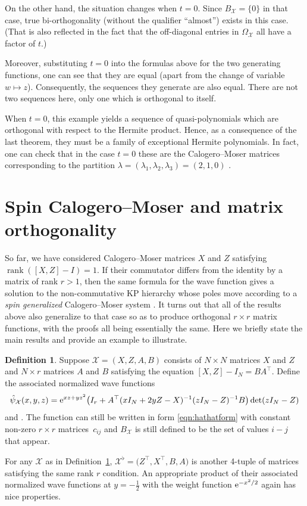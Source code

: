 \documentclass[10pt,a4paper]{amsart}
\numberwithin{equation}{section}
\theoremstyle{definition}
\newtheorem{Definition}[Theorem]{Definition}
\def\X{\mathcal{X}}
\begin{document}
On the other hand, the situation changes when $t=0$. Since
$B_{\X}=\{0\}$ in that case,
 true bi-orthogonality (without the qualifier ``almost'') exists
in this case. (That is also reflected in the fact that the
off-diagonal entries in $\Omega_{\X}$ all have a factor of $t$.)

Moreover, substituting $t=0$ into the formulas above for the two
generating functions, one can see that they are equal
(apart from the change of variable $w\mapsto z$). Consequently, the
sequences they generate are also equal. There are not two sequences
here, only one which is orthogonal to itself.

When $t=0$, this example yields a sequence of quasi-polynomials which are
orthogonal with respect to the Hermite product.
Hence, as a consequence of the last theorem, they must be a family of exceptional Hermite polynomials.
In fact, one can check that in the case $t=0$ these are the Calogero--Moser matrices
corresponding to the partition $\lambda=(\lambda_1,\lambda_2,\lambda_3)=(2,1,0)$ \cite{PThesis,PalusoKasman,WilsonCM}.

\section{Spin Calogero--Moser and matrix orthogonality}

So far, we have considered Calogero--Moser matrices $X$ and $Z$ satisfying
$\operatorname{rank}([X,Z]-I)=1$. If their commutator differs from the
identity by a matrix of rank $r>1$, then the same formula for the wave
function gives a solution to the non-commutative KP hierarchy whose
poles move according to a \textit{spin generalized} Calogero--Moser
system \cite{BGK}. It turns out that all of the results above also
generalize to that case so as to produce orthogonal $r\times r$ matrix
functions, with the proofs all being essentially the
same. Here we briefly state the main results and provide an example
to illustrate.

\begin{Definition}\label{def:spin}
Suppose $\X=(X,Z,A,B)$ consists of $N\times N$ matrices $X$ and $Z$
and $N\times r$ matrices $A$ and $B$ satisfying the equation
$[X,Z]-I_N=BA^{\top}$. Define the associated normalized wave
functions
\[
\hat\psi_{\X}(x,y,z)={\rm e}^{xz+yz^2}\bigl(I_r+A^\top(xI_N+2yZ-X)^{-1}(zI_N-Z)^{-1}B\bigr)\det(zI_N-Z)
 \]
 and
\smash{$
\hat{\hat\psi}_{\X}(x,y,z)=\hat\psi_{\X}(x,y,z)\det(xI_N+2yZ-X)$}.
The function \smash{$\hat{\hat\psi}_{\X}(x,0,z)$} can still be written in form
\eqref{eqn:hathatform} with constant non-zero $r\times r$ matrices~$c_{ij}$ and $B_{\X}$ is still defined to be the set of values $i-j$
that appear.
\end{Definition}
 For any $\X$ as in Definition~\ref{def:spin},
 $\X^{\flat}=\bigl(Z^\top,X^\top,B,A\bigr)$ is another 4-tuple of matrices
 satisfying the same rank $r$ condition. An appropriate product of their
 associated normalized wave functions at $y=-\tfrac{1}{2}$ with the weight
 function ${\rm e}^{-x^2/2}$ again has nice properties.
\end{document}
